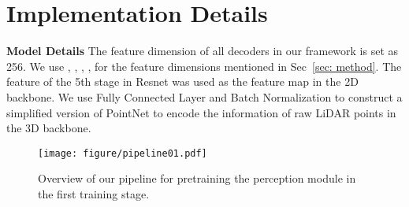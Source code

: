 \documentclass[10pt,twocolumn,letterpaper]{article}
\begin{document}
\begin{table*}[t]
    \centering
    \caption{Comparison of our ReasonNet with other methods in CARLA 42 routes benchmark. Our method outperformed other strong methods in driving score and infraction score.}
    \label{appendix: sota 42 routes}
\end{table*}

\section{Implementation Details}
\label{appendix: Implementation Details}


\noindent\textbf{Model Details} The feature dimension of all decoders in our framework is set as 256. We use , , , ,  for the feature dimensions mentioned in Sec~\ref{sec: method}. The feature of the 5th stage in Resnet was used as the feature map  in the 2D backbone. We use Fully Connected Layer and Batch Normalization \cite{ioffe2015batch} to construct a simplified version of PointNet\cite{qi2018frustum} to encode the information of raw LiDAR points in the 3D backbone.

\begin{figure}[h]
    \centering
    \texttt{[image: figure/pipeline01.pdf]}
    \caption{Overview of our pipeline for pretraining the perception module in the first training stage.}
    \label{fig:pipeline01}
\end{figure}
\end{document}
